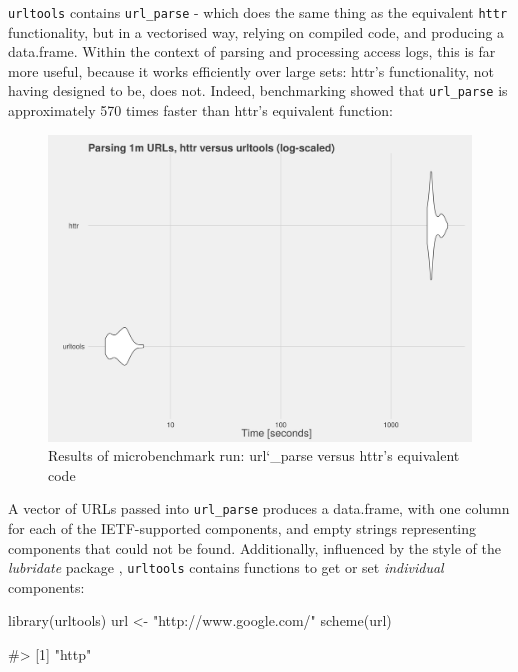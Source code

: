 \texttt{urltools} contains \texttt{url\_parse} - which does the same
thing as the equivalent \texttt{httr} functionality, but in a vectorised
way, relying on compiled code, and producing a data.frame. Within the
context of parsing and processing access logs, this is far more useful,
because it works efficiently over large sets: httr's functionality, not
having designed to be, does not. Indeed, benchmarking showed that
\texttt{url\_parse} is approximately 570 times faster than httr's
equivalent function:

\begin{figure}[h]
    \centering
    \includegraphics[scale=0.4]{parsing_benchmarks}
    \caption{Results of microbenchmark run: url\char`_parse versus httr's equivalent code}
\end{figure}

\newpage

A vector of URLs passed into \texttt{url\_parse} produces a data.frame,
with one column for each of the IETF-supported components, and empty
strings representing components that could not be found. Additionally,
influenced by the style of the \emph{lubridate} package
\citep{lubridate}, \texttt{urltools} contains functions to get or set
\emph{individual} components:

\begin{Schunk}
\begin{Sinput}
library(urltools)
url <- "http://www.google.com/"
scheme(url)
\end{Sinput}
\begin{Soutput}
#> [1] "http"
\end{Soutput}
\end{Schunk}

